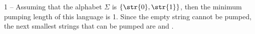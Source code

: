 1 -- Assuming that the alphabet $\Sigma$ is $\{\str{0},\str{1}\}$, then the minimum pumping length of this language is 1. Since the empty string cannot be pumped, the next smallest strings that can be pumped are  and .